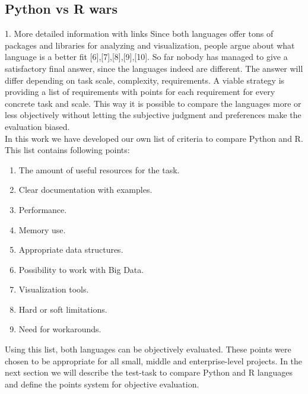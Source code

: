 \documentclass [twoside,
  11pt, a4paper,
  footinclude=true,
  headinclude=true,
  cleardoublepage=empty
]{article}
\begin{document}
\subsection{Python vs R wars}
1. More detailed information with links
Since both languages offer tons of packages and libraries for analyzing and visualization, people argue about what language is a better fit [6],[7],[8],[9],[10].
So far nobody has managed to give a satisfactory final answer, since the languages indeed are different. The answer will differ depending on task scale, complexity, requirements. A viable strategy is providing a list of requirements with points for each requirement for every concrete task and scale. This way it is possible to compare the languages more or less objectively without letting the subjective judgment and preferences make the evaluation biased.\\
In this work we have developed our own list of criteria to compare Python and R. This list contains following points:
\begin{enumerate}
    \item The amount of useful resources for the task.
    \item Clear documentation with examples.
    \item Performance.
    \item Memory use.
    \item Appropriate data structures.
    \item Possibility to work with Big Data.
    \item Visualization tools.
    \item Hard or soft limitations.
    \item Need for workarounds.
\end{enumerate}
Using this list, both languages can be objectively evaluated. These points were chosen to be appropriate for all small, middle and enterprise-level projects. In the next section we will describe the test-task to compare Python and R languages and define the points system for objective evaluation.\\
\end{document}
